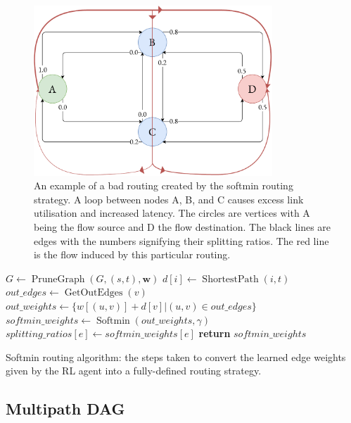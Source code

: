 \begin{figure}
    \centering
    \includegraphics[width=0.8\textwidth]{figures/bad_route.pdf}
    \caption{An example of a bad routing created by the softmin routing strategy. A loop between nodes A, B, and C causes excess link utilisation and increased latency. The circles are vertices with A being the flow source and D the flow destination. The black lines are edges with the numbers signifying their splitting ratios. The red line is the flow induced by this particular routing.}
    \label{fig:bad_route}
\end{figure}

\begin{algorithm}[t]
\small
\begin{algorithmic}
    \State $G \gets \operatorname{PruneGraph}(G, (s, t), \bm{w})$
      \State $d[i] \gets \operatorname{ShortestPath}(i, t)$
    \EndFor
      \State $out\_edges \gets \operatorname{GetOutEdges}(v)$
      \State $out\_weights \gets \{w[(u, v)] + d[v] | (u, v) \in out\_edges\}$
      \State $softmin\_weights \gets \operatorname{Softmin}(out\_weights, \gamma)$
        \State $splitting\_ratios[e] \gets softmin\_weights[e]$
      \EndFor
    \EndFor
  \EndFor
  \State \textbf{return} $softmin\_weights$
\EndFunction
\end{algorithmic}
\caption{Softmin routing algorithm: the steps taken to convert the learned edge weights given by the RL agent into a fully-defined routing strategy.}
\label{algorithm:softmin}
\end{algorithm}

\subsection{Multipath DAG}


